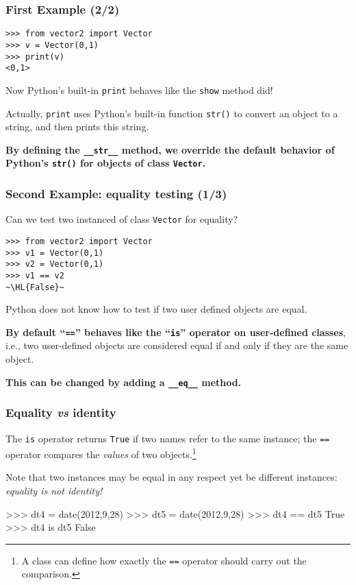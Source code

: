 \documentclass[english,serif,mathserif,xcolor=pdftex,dvipsnames,table]{beamer}
\begin{document}
\begin{frame}[fragile]
  \frametitle{First Example (2/2)}
\begin{lstlisting}
>>> from vector2 import Vector
>>> v = Vector(0,1)
>>> print(v)
<0,1>
\end{lstlisting}

  \+
  Now Python's built-in \texttt{print} behaves like the \texttt{show} method did!

  \+ Actually, \texttt{print} uses Python's built-in function
  \texttt{str()} to convert an object to a string, and then prints
  this string.

  \+ {\bfseries By defining the \lstinline|__str__| method, we
    override the default behavior of Python's \lstinline|str()| for
    objects of class \texttt{Vector}.}
\end{frame}


\begin{frame}[fragile]
  \frametitle{Second Example: equality testing (1/3)}

  Can we test two instanced of class \texttt{Vector} for equality?
\begin{lstlisting}
>>> from vector2 import Vector
>>> v1 = Vector(0,1)
>>> v2 = Vector(0,1)
>>> v1 == v2
~\HL{False}~
\end{lstlisting}

  \+ Python does not know how to test if two user defined objects are
  equal.

  \+ \textbf{By default ``\texttt{==}'' behaves like the
    ``\texttt{is}'' operator on user-defined classes}, i.e., two
  user-defined objects are considered equal if and only if they are
  the same object.

  \+ \textbf{This can be changed by adding a \lstinline|__eq__| method.}
\end{frame}


\begin{frame}[fragile]
  \frametitle{Equality \emph{vs} identity}
  The \texttt{is} operator returns \texttt{True} if two names refer to
  the same instance; the \texttt{==} operator compares the
  \emph{values} of two objects.\footnote{A class can define how
    exactly the \texttt{==} operator should carry out the comparison.}

  \+
  Note that two instances may be equal in any respect yet be
  different instances: \emph{equality is not identity!}
\begin{python}
>>> dt4 = date(2012,9,28)
>>> dt5 = date(2012,9,28)
>>> dt4 == dt5
True
>>> dt4 is dt5
False
\end{python}
\end{frame}
\end{document}
